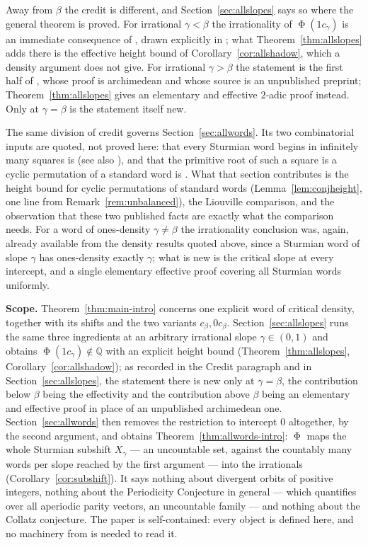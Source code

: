 \documentclass[11pt,reqno]{amsart}
\theoremstyle{plain}
\theoremstyle{definition}
\newcommand{\Q}{\mathbb{Q}}
\DeclareMathOperator{\Ph}{\Phi}
\begin{document}
Away from $\beta$ the credit is different, and
Section~\ref{sec:allslopes} says so where the general theorem is proved. For
irrational $\gamma<\beta$ the irrationality of $\Ph(1c_\gamma)$ is an immediate
consequence of \cite[Theorem~2.7(b)]{MonksYazinski2004}, drawn explicitly in
\cite[p.~6]{LopezStoll2021}; what
Theorem~\ref{thm:allslopes} adds there is the effective height bound of
Corollary~\ref{cor:allshadow}, which a density argument does not give. For
irrational $\gamma>\beta$ the statement is the first half of
\cite[Theorem~1]{LopezStoll2021}, whose proof is archimedean and whose source is
an unpublished preprint; Theorem~\ref{thm:allslopes} gives an elementary and
effective $2$-adic proof instead. Only at $\gamma=\beta$ is the statement itself
new.

The same division of credit governs Section~\ref{sec:allwords}. Its two
combinatorial inputs are quoted, not proved here: that every Sturmian word
begins in infinitely many squares is \cite[Theorem~1]{ADQZ2001} (see also
\cite{DamanikKillipLenz2000}), and that the primitive root of such a square is a
cyclic permutation of a standard word is
\cite[Proposition~3.2]{BertheHoltonZamboni2006}. What that section contributes is
the height bound for cyclic permutations of standard words
(Lemma~\ref{lem:conjheight}, one line from Remark~\ref{rem:unbalanced}), the
Liouville comparison, and the observation that these two published facts are
exactly what the comparison needs. For a word of ones-density $\gamma\ne\beta$
the irrationality conclusion was, again, already available from the density
results quoted above, since a Sturmian word of slope $\gamma$ has ones-density
exactly $\gamma$; what is new is the critical slope at every intercept, and a
single elementary effective proof covering all Sturmian words uniformly.

\medskip
\noindent\textbf{Scope.} Theorem~\ref{thm:main-intro} concerns one explicit word
of critical density, together with its shifts and the two variants
$c_\beta,0c_\beta$. Section~\ref{sec:allslopes} runs the same three ingredients
at an arbitrary irrational slope $\gamma\in(0,1)$ and obtains
$\Ph(1c_\gamma)\notin\Q$ with an explicit height bound
(Theorem~\ref{thm:allslopes}, Corollary~\ref{cor:allshadow}); as recorded in
the Credit paragraph and in Section~\ref{sec:allslopes}, the statement there is
new only at $\gamma=\beta$, the contribution below $\beta$ being the
effectivity and the contribution above $\beta$ being an elementary and
effective proof in place of an unpublished archimedean one.
Section~\ref{sec:allwords} then removes the restriction to intercept $0$
altogether, by the second argument, and obtains
Theorem~\ref{thm:allwords-intro}: $\Ph$ maps the whole Sturmian subshift
$X_\gamma$ --- an uncountable set, against the countably many words per slope
reached by the first argument --- into the irrationals
(Corollary~\ref{cor:subshift}). It says nothing about divergent orbits of positive integers,
nothing about the Periodicity Conjecture in general --- which quantifies over all
aperiodic parity vectors, an uncountable family --- and nothing about the
Collatz conjecture. The paper is self-contained: every object is defined here,
and no machinery from \cite{DeJesusA,DeJesusB} is needed to read it.
\end{document}
